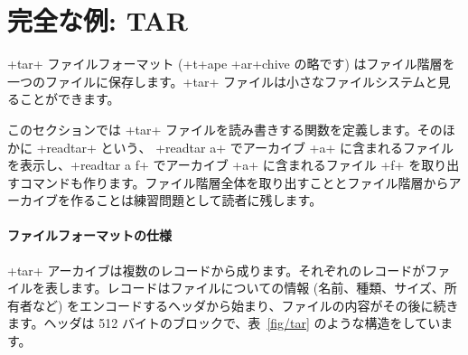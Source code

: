 \section{完全な例: TAR}

\ml+tar+ ファイルフォーマット (\ml+t+ape \ml+ar+chive の略です) はファイル階層を一つのファイルに保存します。\ml+tar+ ファイルは小さなファイルシステムと見ることができます。

このセクションでは \ml+tar+ ファイルを読み書きする関数を定義します。そのほかに \ml+readtar+ という、 \ml+readtar a+ でアーカイブ \ml+a+ に含まれるファイルを表示し、\ml+readtar a f+ でアーカイブ \ml+a+ に含まれるファイル \ml+f+ を取り出すコマンドも作ります。ファイル階層全体を取り出すこととファイル階層からアーカイブを作ることは練習問題として読者に残します。

\paragraph{ファイルフォーマットの仕様}

\ml+tar+ アーカイブは複数のレコードから成ります。それぞれのレコードがファイルを表します。レコードはファイルについての情報 (名前、種類、サイズ、所有者など) をエンコードするヘッダから始まり、ファイルの内容がその後に続きます。ヘッダは 512 バイトのブロックで、表~\ref{fig/tar} のような構造をしています。

